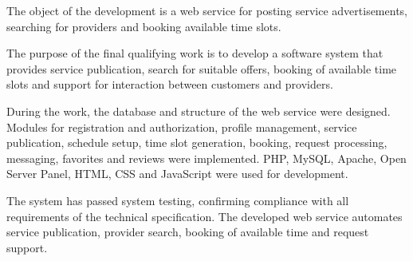 The object of the development is a web service for posting service advertisements, searching for providers and booking available time slots.

The purpose of the final qualifying work is to develop a software system that provides service publication, search for suitable offers, booking of available time slots and support for interaction between customers and providers.

During the work, the database and structure of the web service were designed. Modules for registration and authorization, profile management, service publication, schedule setup, time slot generation, booking, request processing, messaging, favorites and reviews were implemented. PHP, MySQL, Apache, Open Server Panel, HTML, CSS and JavaScript were used for development.

The system has passed system testing, confirming compliance with all requirements of the technical specification. The developed web service automates service publication, provider search, booking of available time and request support.
